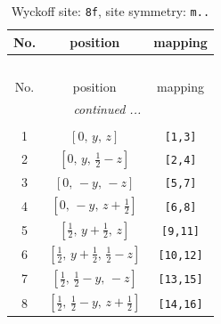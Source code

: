 \documentclass[fleqn,8pt]{jsarticle}
\begin{document}
\begin{longtable}{ccc}
\caption{Wyckoff site: {\tt 8f}, site symmetry: {\tt m..}}
 \\
 \hline \hline
No. & position & mapping \\ \hline \endfirsthead

\multicolumn{2}{l}{\tablename\ \thetable{}} \\
 \hline \hline
No. & position & mapping \\ \hline \endhead

 \hline \hline
\multicolumn{2}{r}{\footnotesize\it continued ...} \\ \endfoot

 \hline \hline
\multicolumn{2}{r}{} \\ \endlastfoot

1 & $\left[ 0,\, y,\, z \right]$ & {\tt [1,3]} \\ \hline
2 & $\left[ 0,\, y,\, \frac{1}{2} - z \right]$ & {\tt [2,4]} \\ \hline
3 & $\left[ 0,\, - y,\, - z \right]$ & {\tt [5,7]} \\ \hline
4 & $\left[ 0,\, - y,\, z + \frac{1}{2} \right]$ & {\tt [6,8]} \\ \hline
5 & $\left[ \frac{1}{2},\, y + \frac{1}{2},\, z \right]$ & {\tt [9,11]} \\ \hline
6 & $\left[ \frac{1}{2},\, y + \frac{1}{2},\, \frac{1}{2} - z \right]$ & {\tt [10,12]} \\ \hline
7 & $\left[ \frac{1}{2},\, \frac{1}{2} - y,\, - z \right]$ & {\tt [13,15]} \\ \hline
8 & $\left[ \frac{1}{2},\, \frac{1}{2} - y,\, z + \frac{1}{2} \right]$ & {\tt [14,16]} \\
\end{longtable}
\renewcommand{\arraystretch}{1.2}
\end{document}
